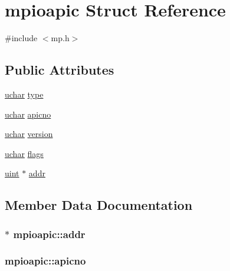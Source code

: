 \hypertarget{structmpioapic}{}\section{mpioapic Struct Reference}
\label{structmpioapic}


{\ttfamily \#include $<$mp.\+h$>$}

\subsection*{Public Attributes}
\begin{DoxyCompactItemize}
\item 
\hyperlink{types_8h_a65f85814a8290f9797005d3b28e7e5fc}{uchar} \hyperlink{structmpioapic_a8d7527bad798d6f8a59a21df06879f0f}{type}
\item 
\hyperlink{types_8h_a65f85814a8290f9797005d3b28e7e5fc}{uchar} \hyperlink{structmpioapic_a9a975b41f6af43937d67c3b63235dd7d}{apicno}
\item 
\hyperlink{types_8h_a65f85814a8290f9797005d3b28e7e5fc}{uchar} \hyperlink{structmpioapic_a7c6f3d950f89e2b982fd53f7c59681e7}{version}
\item 
\hyperlink{types_8h_a65f85814a8290f9797005d3b28e7e5fc}{uchar} \hyperlink{structmpioapic_a9cc0f4c76312b7d074c558cbcad38a12}{flags}
\item 
\hyperlink{types_8h_a91ad9478d81a7aaf2593e8d9c3d06a14}{uint} $\ast$ \hyperlink{structmpioapic_a364bbba1df7846f9c6d271c7c85a7aaa}{addr}
\end{DoxyCompactItemize}


\subsection{Member Data Documentation}
\subsubsection[{\texorpdfstring{addr}{addr}}]{$\ast$ mpioapic\+::addr}\hypertarget{structmpioapic_a364bbba1df7846f9c6d271c7c85a7aaa}{}\label{structmpioapic_a364bbba1df7846f9c6d271c7c85a7aaa}
\subsubsection[{\texorpdfstring{apicno}{apicno}}]{ mpioapic\+::apicno}\hypertarget{structmpioapic_a9a975b41f6af43937d67c3b63235dd7d}{}\label{structmpioapic_a9a975b41f6af43937d67c3b63235dd7d}
